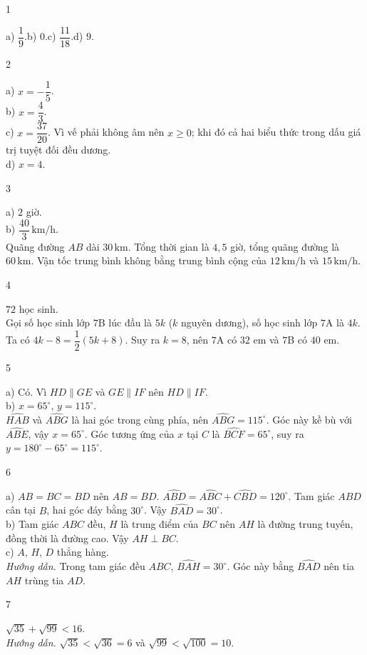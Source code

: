 \begin{Solbook}{1}
 \par \noindent  a) $\dfrac {1}{9}$.\quad b) $0$.\quad c) $\dfrac {11}{18}$.\quad d) $9$.  \hfill \qedEX 
\end{Solbook}
\begin{Solbook}{2}
 \par \noindent  a) $x=-\dfrac {1}{5}$.\\ b) $x=\dfrac {4}{3}$.\\ c) $x=\dfrac {37}{20}$. Vì vế phải không âm nên $x\ge 0$; khi đó cả hai biểu thức trong dấu giá trị tuyệt đối đều dương.\\ d) $x=4$.  \hfill \qedEX 
\end{Solbook}
\begin{Solbook}{3}
 \par \noindent  a) $2$ giờ.\\ b) $\dfrac {40}{3}\,\mathrm {km/h}$.\\ Quãng đường $AB$ dài $30\,\mathrm {km}$. Tổng thời gian là $4{,}5$ giờ, tổng quãng đường là $60\,\mathrm {km}$. Vận tốc trung bình không bằng trung bình cộng của $12\,\mathrm {km/h}$ và $15\,\mathrm {km/h}$.  \hfill \qedEX 
\end{Solbook}
\begin{Solbook}{4}
 \par \noindent  $72$ học sinh.\\ Gọi số học sinh lớp $7$B lúc đầu là $5k$ ($k$ nguyên dương), số học sinh lớp $7$A là $4k$. Ta có $4k-8=\dfrac {1}{2}(5k+8)$. Suy ra $k=8$, nên $7$A có $32$ em và $7$B có $40$ em.  \hfill \qedEX 
\end{Solbook}
\begin{Solbook}{5}
 \par \noindent  a) Có. Vì $HD\parallel GE$ và $GE\parallel IF$ nên $HD\parallel IF$.\\ b) $x=65^{\circ }$, $y=115^{\circ }$.\\ $\widehat {HAB}$ và $\widehat {ABG}$ là hai góc trong cùng phía, nên $\widehat {ABG}=115^{\circ }$. Góc này kề bù với $\widehat {ABE}$, vậy $x=65^{\circ }$. Góc tương ứng của $x$ tại $C$ là $\widehat {BCF}=65^{\circ }$, suy ra $y=180^{\circ }-65^{\circ }=115^{\circ }$.  \hfill \qedEX 
\end{Solbook}
\begin{Solbook}{6}
 \par \noindent  a) $AB=BC=BD$ nên $AB=BD$. $\widehat {ABD}=\widehat {ABC}+\widehat {CBD}=120^{\circ }$. Tam giác $ABD$ cân tại $B$, hai góc đáy bằng $30^{\circ }$. Vậy $\widehat {BAD}=30^{\circ }$.\\ b) Tam giác $ABC$ đều, $H$ là trung điểm của $BC$ nên $AH$ là đường trung tuyến, đồng thời là đường cao. Vậy $AH\perp BC$.\\ c) $A$, $H$, $D$ thẳng hàng.\\ \textit {Hướng dẫn.} Trong tam giác đều $ABC$, $\widehat {BAH}=30^{\circ }$. Góc này bằng $\widehat {BAD}$ nên tia $AH$ trùng tia $AD$.  \hfill \qedEX 
\end{Solbook}
\begin{Solbook}{7}
 \par \noindent  $\sqrt {35}+\sqrt {99}<16$.\\ \textit {Hướng dẫn.} $\sqrt {35}<\sqrt {36}=6$ và $\sqrt {99}<\sqrt {100}=10$.  \hfill \qedEX 
\end{Solbook}
